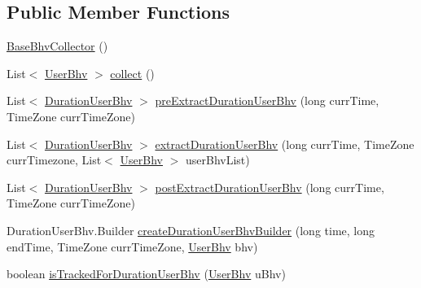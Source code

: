 \subsection*{\-Public \-Member \-Functions}
\begin{DoxyCompactItemize}
\item 
\hyperlink{classlab_1_1davidahn_1_1appshuttle_1_1collect_1_1bhv_1_1_base_bhv_collector_a031a9e735cbb2b6a083bcef9cad85825}{\-Base\-Bhv\-Collector} ()
\item 
\-List$<$ \hyperlink{interfacelab_1_1davidahn_1_1appshuttle_1_1collect_1_1bhv_1_1_user_bhv}{\-User\-Bhv} $>$ \hyperlink{classlab_1_1davidahn_1_1appshuttle_1_1collect_1_1bhv_1_1_base_bhv_collector_aab4a8a64d8d5ea4a8439a977505cd23a}{collect} ()
\item 
\-List$<$ \hyperlink{classlab_1_1davidahn_1_1appshuttle_1_1collect_1_1bhv_1_1_duration_user_bhv}{\-Duration\-User\-Bhv} $>$ \hyperlink{classlab_1_1davidahn_1_1appshuttle_1_1collect_1_1bhv_1_1_base_bhv_collector_a3f53a3734fc6d695a0e9032adbcee039}{pre\-Extract\-Duration\-User\-Bhv} (long curr\-Time, \-Time\-Zone curr\-Time\-Zone)
\item 
\-List$<$ \hyperlink{classlab_1_1davidahn_1_1appshuttle_1_1collect_1_1bhv_1_1_duration_user_bhv}{\-Duration\-User\-Bhv} $>$ \hyperlink{classlab_1_1davidahn_1_1appshuttle_1_1collect_1_1bhv_1_1_base_bhv_collector_a76745b2106da9aba911b9ff9bb48de3c}{extract\-Duration\-User\-Bhv} (long curr\-Time, \-Time\-Zone curr\-Timezone, \-List$<$ \hyperlink{interfacelab_1_1davidahn_1_1appshuttle_1_1collect_1_1bhv_1_1_user_bhv}{\-User\-Bhv} $>$ user\-Bhv\-List)
\item 
\-List$<$ \hyperlink{classlab_1_1davidahn_1_1appshuttle_1_1collect_1_1bhv_1_1_duration_user_bhv}{\-Duration\-User\-Bhv} $>$ \hyperlink{classlab_1_1davidahn_1_1appshuttle_1_1collect_1_1bhv_1_1_base_bhv_collector_a77c788394d3a568d0d7254be2c04b2e7}{post\-Extract\-Duration\-User\-Bhv} (long curr\-Time, \-Time\-Zone curr\-Time\-Zone)
\item 
\-Duration\-User\-Bhv.\-Builder \hyperlink{classlab_1_1davidahn_1_1appshuttle_1_1collect_1_1bhv_1_1_base_bhv_collector_afb466450bed595e6fe1ae2ba964c3906}{create\-Duration\-User\-Bhv\-Builder} (long time, long end\-Time, \-Time\-Zone curr\-Time\-Zone, \hyperlink{interfacelab_1_1davidahn_1_1appshuttle_1_1collect_1_1bhv_1_1_user_bhv}{\-User\-Bhv} bhv)
\item 
boolean \hyperlink{classlab_1_1davidahn_1_1appshuttle_1_1collect_1_1bhv_1_1_base_bhv_collector_aa3bd7893a53487268237ced0c670a9b4}{is\-Tracked\-For\-Duration\-User\-Bhv} (\hyperlink{interfacelab_1_1davidahn_1_1appshuttle_1_1collect_1_1bhv_1_1_user_bhv}{\-User\-Bhv} u\-Bhv)
\end{DoxyCompactItemize}
